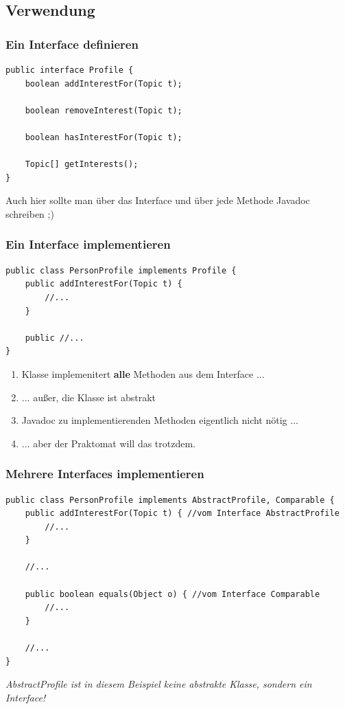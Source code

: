 \documentclass[18pt]{beamer}
\begin{document}
\subsection*{Verwendung}

\begin{frame}[containsverbatim]
	\frametitle{Ein Interface definieren}
	\begin{lstlisting}
public interface Profile {
	boolean addInterestFor(Topic t);
	
	boolean removeInterest(Topic t);
	
	boolean hasInterestFor(Topic t);
	
	Topic[] getInterests();
}
	\end{lstlisting}
	
	Auch hier sollte man über das Interface und über jede Methode Javadoc schreiben ;)
\end{frame}


\begin{frame}[containsverbatim]
	\frametitle{Ein Interface implementieren}
	\begin{lstlisting}
public class PersonProfile implements Profile {
	public addInterestFor(Topic t) {
		//...
	}
	
	public //...
}

	\end{lstlisting}
	
	\begin{enumerate}
		\item Klasse implemenitert \textbf{alle} Methoden aus dem Interface ...
		\item ... außer, die Klasse ist abstrakt
		\item Javadoc zu implementierenden Methoden eigentlich nicht nötig ...
		\item ... aber der Praktomat will das trotzdem.
	\end{enumerate}
\end{frame}


\begin{frame}[containsverbatim]
	\frametitle{Mehrere Interfaces implementieren}
	\begin{lstlisting}
public class PersonProfile implements AbstractProfile, Comparable {
	public addInterestFor(Topic t) { //vom Interface AbstractProfile
		//...
	}
	
	//...
	
	public boolean equals(Object o) { //vom Interface Comparable
		//...
	}

	//...
}
	\end{lstlisting}
	
	\emph{AbstractProfile ist in diesem Beispiel keine abstrakte Klasse, sondern ein Interface!}
\end{frame}
\end{document}
